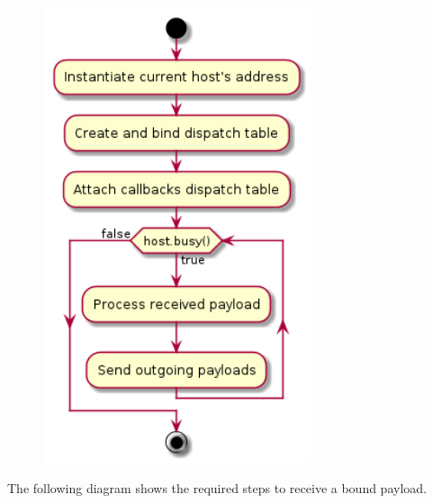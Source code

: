 \documentclass[11pt]{report}
\newcommand{\+}{\discretionary{\mbox{\scriptsize$\hookleftarrow$}}{}{}}
\begin{document}
                \begin{figure}[H]
                \centering
                \includegraphics[width=0.7\textwidth]{d/ac/conthost.png}
                \end{figure}





                \newpage
                The following diagram shows the required steps to receive a bound payload.
\end{document}
